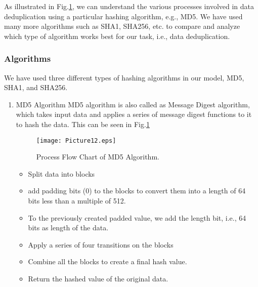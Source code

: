 \documentclass[%
 aip,
cp,  %
 amsmath,amssymb,%
 reprint,%
]{revtex4-2}
\begin{document}
As illustrated in Fig.\ref{fig:MD5}, we can understand the various processes involved in data deduplication using a particular hashing algorithm, e.g., MD5. We have used many more algorithms such as SHA1, SHA256, etc. to compare and analyze which type of algorithm works best for our task, i.e., data deduplication.

\subsubsection{\label{sec:algos}Algorithms }
We have used three different types of hashing algorithms in our model, MD5, SHA1, and SHA256. 
\begin{enumerate}
    \item {MD5 Algorithm}
    MD5 algorithm is also called as Message Digest algorithm, which takes input data and applies a series of message digest functions to it to hash the data. This can be seen in Fig.\ref{fig:MD5}%
    \begin{figure}
\texttt{[image: Picture12.eps]}%
\caption{ Process Flow Chart of MD5 Algorithm.}
\label{fig:MD5}
\end{figure}
    \begin{itemize}
        \item {Split data into blocks}
        \item{add padding bits (0) to the blocks to convert them into a length of 64 bits less than a multiple of 512. }
        \item{To the previously created padded value, we add the length bit, i.e., 64 bits as length of the data. }
        \item{Apply a series of four transitions on the blocks}
        \item{Combine all the blocks to create a final hash value.}
        \item{Return the hashed value of the original data.}
    \end{itemize}


\end{enumerate}
\end{document}
